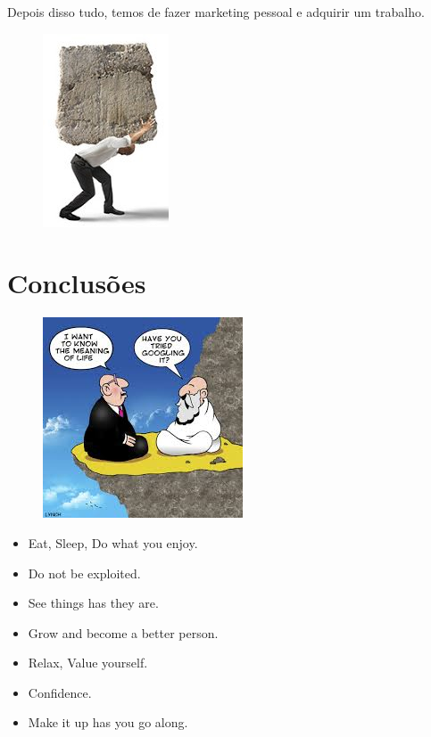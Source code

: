 \begin{frame}
Depois disso tudo, temos de fazer marketing pessoal e adquirir um trabalho. \vfill
\begin{minipage}{5cm}
	\begin{figure}[ht]
		\flushleft
		\includegraphics[scale=0.6]{"./image/Job/Burden.jpg"}
	\end{figure}
\end{minipage}
\end{frame}
\section{Conclusões}
\begin{frame}
\begin{minipage}{7cm}
	\begin{figure}[ht]
		\flushleft
		\includegraphics[scale=0.7]{"./image/Objectives/Meaning of Life.jpeg"}
	\end{figure}
\end{minipage}
\begin{minipage}{5cm}
	\begin{itemize}
		\item Eat, Sleep, Do what you enjoy.
		\item Do not be exploited.
		\item See things has they are.
		\item Grow and become a better person.
		\item Relax, Value yourself.
		\item Confidence.
		\item Make it up has you go along.
	\end{itemize}
\end{minipage}
\end{frame}

